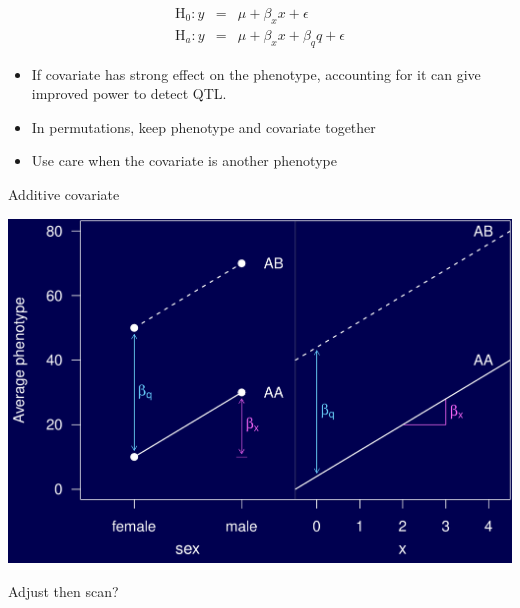 \documentclass[12pt]{article}
\newcommand{\headsize}{\fontsize{35}{35} \selectfont}
\newcommand{\smallsize}{\fontsize{25}{30} \selectfont}
\begin{document}
\vspace{15mm}

\color{mywhite} \smallsize

\begin{eqnarray*}
\text{H}_0: y & = & \mu + \beta_x x + \epsilon \\
\text{H}_a: y & = & \mu + \beta_x x + \beta_q q + \epsilon
\end{eqnarray*}

\vspace{30mm}

\hspace{0.5in}
\begin{minipage}{9.5in}
\begin{itemize}
\itemsep20pt
\item If covariate has strong effect on the phenotype, accounting for
  it can give improved power to detect QTL.
\item In permutations, keep phenotype and covariate together
\item Use care when the covariate is another phenotype
\end{itemize}
\end{minipage}

\newpage

\headsize \color{myyellow}
\hfill \begin{minipage}{5.75in}
\centering
Additive covariate
\end{minipage}

\vfill

\centerline{\includegraphics{FigsA/addcovar.pdf}}

\newpage

\headsize \color{myyellow}
\hfill \begin{minipage}{5.75in}
\centering
Adjust then scan?
\end{minipage}
\end{document}
